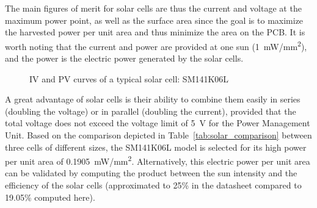 \documentclass{EPL-master-thesis-covers-EN}
\begin{document}
The main figures of merit for solar cells are thus the current and voltage at the maximum power point, as well as the surface area since the goal is to maximize the harvested power per unit area and thus minimize the area on the PCB. It is worth noting that the current and power are provided at one sun (\SI{1}{mW/mm^2}), and the power is the electric power generated by the solar cells.

\begin{figure}[H]
    \centering
    
    \caption{IV and PV curves of a typical solar cell: SM141K06L}
    \label{fig:solar_IV}
\end{figure}


A great advantage of solar cells is their ability to combine them easily in series (doubling the voltage) or in parallel (doubling the current), provided that the total voltage does not exceed the voltage limit of \SI{5}{V} for the Power Management Unit. Based on the comparison depicted in Table~\ref{tab:solar_comparison} between three cells of different sizes, the SM141K06L model is selected for its high power per unit area of \SI{0.1905}{mW/mm^2}. Alternatively, this electric power per unit area can be validated by computing the product between the sun intensity and the efficiency of the solar cells (approximated to 25\% in the datasheet compared to 19.05\% computed here).

\begin{table}[H]
\centering
{}
\caption{Comparison of several solar cells}
\label{tab:solar_comparison}
\end{table}
\end{document}
